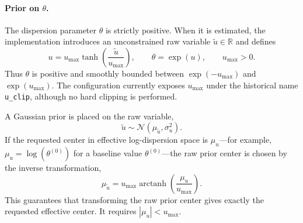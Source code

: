 \paragraph{Prior on $\theta$.}
The dispersion parameter $\theta$ is strictly positive. When it is estimated,
the implementation introduces an unconstrained raw variable $\widetilde u\in\mathbb R$
and defines
\[
u
=
u_{\max}\tanh\!\left(\frac{\widetilde u}{u_{\max}}\right),
\qquad
\theta=\exp(u),
\qquad u_{\max}>0.
\]
Thus $\theta$ is positive and smoothly bounded between
$\exp(-u_{\max})$ and $\exp(u_{\max})$. The configuration currently exposes
$u_{\max}$ under the historical name \texttt{u\_clip}, although no hard clipping
is performed.

A Gaussian prior is placed on the raw variable,
\[
\widetilde u\sim\mathcal N(\mu_{\widetilde u},\sigma_u^2).
\]
If the requested center in effective log-dispersion space is $\mu_u$---for example,
$\mu_u=\log(\theta^{(0)})$ for a baseline value $\theta^{(0)}$---the raw prior
center is chosen by the inverse transformation,
\[
\mu_{\widetilde u}
=
u_{\max}\operatorname{arctanh}\!\left(\frac{\mu_u}{u_{\max}}\right).
\]
This guarantees that transforming the raw prior center gives exactly the requested
effective center. It requires $|\mu_u|<u_{\max}$.

